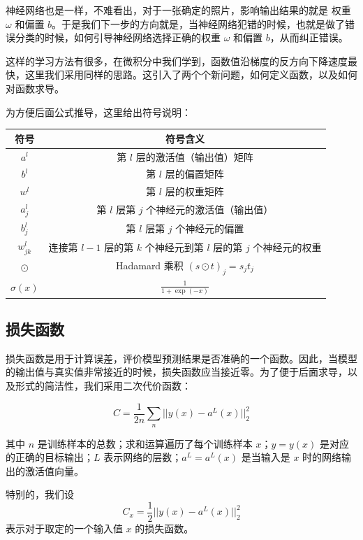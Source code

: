 \documentclass{ctexart}
\numberwithin{equation}{section}    %
\begin{document}
神经网络也是一样，不难看出，对于一张确定的照片，影响输出结果的就是 权重 $\omega$ 和偏置 $b$。于是我们下一步的方向就是，当神经网络犯错的时候，也就是做了错误分类的时候，如何引导神经网络选择正确的权重 $\omega$ 和偏置 $b$，从而纠正错误。

这样的学习方法有很多，在微积分中我们学到，函数值沿梯度的反方向下降速度最快，这里我们采用同样的思路。这引入了两个个新问题，如何定义函数，以及如何对函数求导。

为方便后面公式推导，这里给出符号说明：
\begin{table}[h]
    \centering
    \begin{tabular}{cc}
        \toprule
        符号 & 符号含义\\
        \midrule
        $a^l$ & 第 $l$ 层的激活值（输出值）矩阵\\
        $b^l$ & 第 $l$ 层的偏置矩阵\\
        $w^l$ & 第 $l$ 层的权重矩阵\\
        $a_j^l$ & 第 $l$ 层第 $j$ 个神经元的激活值（输出值）\\
        $b_j^l$ & 第 $l$ 层第 $j$ 个神经元的偏置\\
        $w^l_{jk}$ & 连接第 $l-1$ 层的第 $k$ 个神经元到第 $l$ 层的第 $j$ 个神经元的权重\\
        $\odot$ & Hadamard 乘积 $(s \odot t)_{j}=s_{j} t_{j}$\\
        $\sigma(x)$ & $\frac{1}{1+\exp(-x)}$\\
        \bottomrule
    \end{tabular}
\end{table}
\subsection{损失函数}
损失函数是用于计算误差，评价模型预测结果是否准确的一个函数。因此，当模型的输出值与真实值非常接近的时候，损失函数应当接近零。为了便于后面求导，以及形式的简洁性，我们采用二次代价函数：

\begin{equation}
    C=\frac{1}{2n}\sum_{n}\lvert\lvert y(x)-a^L(x)\rvert\rvert^2_2
\end{equation}

其中 $n$ 是训练样本的总数；求和运算遍历了每个训练样本 $x$；$y = y(x)$ 是对应的正确的⽬标输出；$L$ 表⽰⽹络的层数；$a^L = a^L(x)$ 是当输⼊是 $x$ 时的⽹络输出的激活值向量。

特别的，我们设 
\begin{equation}
    C_x=\frac{1}{2}\lvert\lvert y(x)-a^L(x)\rvert\rvert^2_2
\end{equation}
表示对于取定的一个输入值 $x$ 的损失函数。
\end{document}
